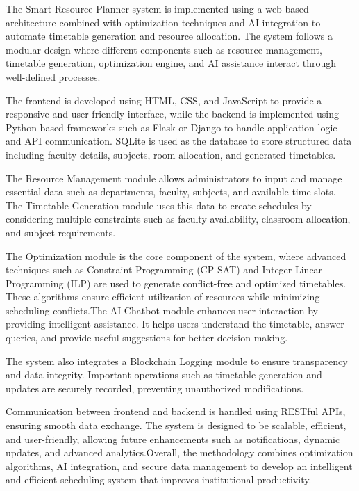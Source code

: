 \documentclass[a4paper, 12pt]{report}
\begin{document}
\par The Smart Resource Planner system is implemented using a web-based architecture combined with optimization techniques and AI integration to automate timetable generation and resource allocation. The system follows a modular design where different components such as resource management, timetable generation, optimization engine, and AI assistance interact through well-defined processes.\\

\par The frontend is developed using HTML, CSS, and JavaScript to provide a responsive and user-friendly interface, while the backend is implemented using Python-based frameworks such as Flask or Django to handle application logic and API communication. SQLite is used as the database to store structured data including faculty details, subjects, room allocation, and generated timetables.\\

\par The Resource Management module allows administrators to input and manage essential data such as departments, faculty, subjects, and available time slots. The Timetable Generation module uses this data to create schedules by considering multiple constraints such as faculty availability, classroom allocation, and subject requirements.\\

\par The Optimization module is the core component of the system, where advanced techniques such as Constraint Programming (CP-SAT) and Integer Linear Programming (ILP) are used to generate conflict-free and optimized timetables. These algorithms ensure efficient utilization of resources while minimizing scheduling conflicts.The AI Chatbot module enhances user interaction by providing intelligent assistance. It helps users understand the timetable, answer queries, and provide useful suggestions for better decision-making.\\

\par The system also integrates a Blockchain Logging module to ensure transparency and data integrity. Important operations such as timetable generation and updates are securely recorded, preventing unauthorized modifications.\\

\par Communication between frontend and backend is handled using RESTful APIs, ensuring smooth data exchange. The system is designed to be scalable, efficient, and user-friendly, allowing future enhancements such as notifications, dynamic updates, and advanced analytics.Overall, the methodology combines optimization algorithms, AI integration, and secure data management to develop an intelligent and efficient scheduling system that improves institutional productivity.\\
\end{document}
